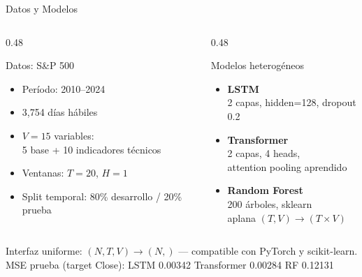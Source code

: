 \documentclass{beamer}
\begin{document}
\begin{frame}{Datos y Modelos}
    \begin{columns}
        \begin{column}{0.48\textwidth}
            \begin{block}{Datos: S\&P 500}
                \begin{itemize}
                    \item Período: 2010--2024
                    \item 3{,}754 días hábiles
                    \item $V = 15$ variables:\\
                    5 base + 10 indicadores técnicos
                    \item Ventanas: $T=20$, $H=1$
                    \item Split temporal: 80\% desarrollo /
                    20\% prueba
                \end{itemize}
            \end{block}
        \end{column}
        \begin{column}{0.48\textwidth}
            \begin{block}{Modelos heterogéneos}
                \begin{itemize}
                    \item \textbf{LSTM}\\
                    2 capas, hidden=128, dropout 0.2
                    \item \textbf{Transformer}\\
                    2 capas, 4 heads,\\
                    attention pooling aprendido
                    \item \textbf{Random Forest}\\
                    200 árboles, sklearn\\
                    aplana $(T,V) \to (T{\times}V)$
                \end{itemize}
            \end{block}
        \end{column}
    \end{columns}
    \vspace{0.3cm}
    \begin{center}
        Interfaz uniforme: $(N, T, V) \rightarrow (N,)$ —
        compatible con PyTorch y scikit-learn.\\
        \small MSE prueba (target Close): LSTM 0.00342 \quad
        Transformer 0.00284 \quad RF 0.12131
    \end{center}
\end{frame}
\end{document}
